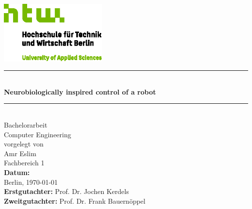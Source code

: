 \documentclass[12pt,a4paper]{report}
\begin{document}
\begin{titlepage}
    \centering
    \vspace*{0.5cm}
    \includegraphics[width=0.4\textwidth]{media/Logo_HTW_Berlin}

    \vspace{1cm}
    \rule{\linewidth}{0.5mm}\\[0.4cm]
    {\Huge \textbf{Neurobiologically inspired control of a robot}}\\[0.3cm]
    \rule{\linewidth}{0.5mm}\\[1.5cm]

    {\LARGE Bachelorarbeit}\\[1.0cm]

    {\Large Computer Engineering}\\[1cm]

    {\large vorgelegt von}\\[0.3cm]
    {\Large Amr Eslim}\\[0.8cm]

    {\large Fachbereich 1}\\[1.0cm]

    {\large \textbf{Datum:}}\\
    {\large Berlin, \today}\\[1.0cm]

    {\large \textbf{Erstgutachter:} Prof. Dr. Jochen Kerdels}\\[0.3cm]
    {\large \textbf{Zweitgutachter:} Prof. Dr. Frank Bauernöppel}\\[1.5cm]

\end{titlepage}
\end{document}

